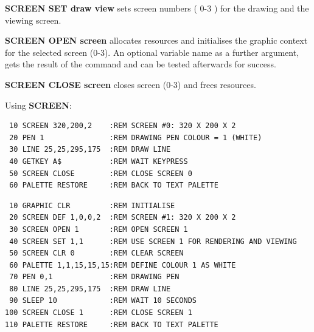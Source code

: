 \begin{description}[leftmargin=2cm,style=nextline]
                {\bf SCREEN SET draw view} sets screen numbers
                ( 0-3 ) for the drawing and the viewing screen.

                {\bf SCREEN OPEN screen} allocates resources and
                initialises the graphic context for the selected
                screen (0-3). An optional variable name as
                a further argument, gets the result of the
                command and can be tested afterwards for success.

                {\bf SCREEN CLOSE screen } closes screen
                (0-3) and frees resources.

\item [Example:] Using {\bf SCREEN}:
\begin{tcolorbox}[colback=black,coltext=white]
\verbatimfont{\codefont}
\begin{verbatim}
 10 SCREEN 320,200,2    :REM SCREEN #0: 320 X 200 X 2
 20 PEN 1               :REM DRAWING PEN COLOUR = 1 (WHITE)
 30 LINE 25,25,295,175  :REM DRAW LINE
 40 GETKEY A$           :REM WAIT KEYPRESS
 50 SCREEN CLOSE        :REM CLOSE SCREEN 0
 60 PALETTE RESTORE     :REM BACK TO TEXT PALETTE
\end{verbatim}
\end{tcolorbox}
\begin{tcolorbox}[colback=black,coltext=white]

\verbatimfont{\codefont}
\begin{verbatim}
 10 GRAPHIC CLR         :REM INITIALISE
 20 SCREEN DEF 1,0,0,2  :REM SCREEN #1: 320 X 200 X 2
 30 SCREEN OPEN 1       :REM OPEN SCREEN 1
 40 SCREEN SET 1,1      :REM USE SCREEN 1 FOR RENDERING AND VIEWING
 50 SCREEN CLR 0        :REM CLEAR SCREEN
 60 PALETTE 1,1,15,15,15:REM DEFINE COLOUR 1 AS WHITE
 70 PEN 0,1             :REM DRAWING PEN
 80 LINE 25,25,295,175  :REM DRAW LINE
 90 SLEEP 10            :REM WAIT 10 SECONDS
100 SCREEN CLOSE 1      :REM CLOSE SCREEN 1
110 PALETTE RESTORE     :REM BACK TO TEXT PALETTE
\end{verbatim}
\end{tcolorbox}
\end{description}


\newpage
